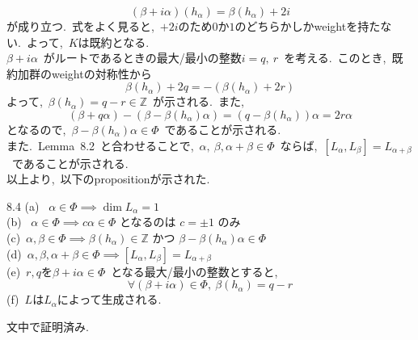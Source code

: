 \documentclass[uplatex,dvipdfmx]{jsarticle}
\begin{document}
\begin{equation*}
    (\beta + i\alpha)(h_\alpha) = \beta(h_\alpha) + 2i
\end{equation*}
が成り立つ.~式をよく見ると,~$+2i$のため$0$か$1$のどちらかしかweightを持たない.~よって,~$K$は既約となる.\\
$\beta + i\alpha$~がルートであるときの最大/最小の整数$i = q,~r$~を考える.~このとき,~既約加群のweightの対称性から
\begin{equation*}
    \beta(h_\alpha)+2q = -(\beta(h_\alpha) + 2r)
\end{equation*}
よって,~$\beta(h_\alpha) = q - r \in \mathbb{Z}$~が示される.~また,
\begin{equation*}
    (\beta + q\alpha) - (\beta - \beta(h_\alpha)\alpha) = (q - \beta(h_\alpha))\alpha = 2 r\alpha
\end{equation*}
となるので,~$\beta - \beta(h_\alpha)\alpha \in \Phi$~であることが示される.\\
また.~Lemma~8.2~と合わせることで,~$\alpha,~\beta, \alpha+\beta \in \Phi$~ならば,~$[L_\alpha,L_\beta] = L_{\alpha+\beta}$~であることが示される.\\
以上より,~以下のpropositionが示された.
\begin{myprop}{8.4}
    (a)~ $\alpha \in \Phi \implies \dim L_\alpha = 1$\\
    (b)~ $\alpha \in \Phi \implies c\alpha \in \Phi$ となるのは $c = \pm 1$ のみ\\
    (c)~$\alpha, \beta \in \Phi \implies \beta(h_\alpha) \in \mathbb{Z}$ かつ $\beta - \beta(h_\alpha)\alpha \in \Phi$\\
    (d)~$\alpha, \beta, \alpha+\beta \in \Phi \implies [L_\alpha, L_\beta] = L_{\alpha+\beta}$\\
    (e)~$r,q$を$\beta + i\alpha \in \Phi$~となる最大/最小の整数とすると,\\
    \begin{equation*}
        \forall (\beta + i\alpha) \in \Phi ,~\beta(h_\alpha) = q - r
    \end{equation*}
    (f)~$L$は$L_\alpha$によって生成される.
\end{myprop}
\begin{myproof}
    文中で証明済み.
\end{myproof}
\newpage
\end{document}
